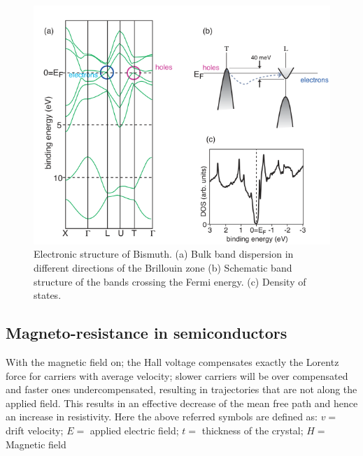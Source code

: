 \documentclass[%
 aip,
 amsmath,amssymb,
 reprint,%
]{revtex4-1}
\begin{document}
    \begin{figure}
        \centering
        \includegraphics[scale = 0.65]{Figures/bi-hall.png}
        \caption{Electronic structure of Bismuth. (a) Bulk band dispersion in different directions of the Brillouin zone (b) Schematic band structure of the bands crossing the Fermi energy. (c) Density of states.}
        \label{fig:bihall}
    \end{figure}
    \subsection{Magneto-resistance in semiconductors}
    With the magnetic field on; the Hall voltage compensates exactly the Lorentz force for carriers with average velocity; slower carriers will be over compensated and faster ones undercompensated, resulting in trajectories that are not along the applied field.
    This results in an effective decrease of the mean free path and hence an increase in resistivity.
    Here the above referred symbols are defined as: $v =$ drift velocity; $E =$ applied electric field; $t
    =$ thickness of the crystal; $H =$ Magnetic field
\end{document}
